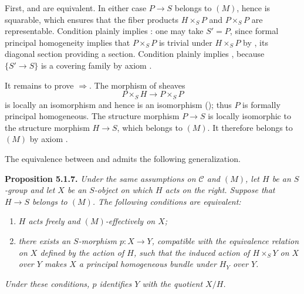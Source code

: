 First,  and  are equivalent. In either case \(P\to S\) belongs to
\((M)\), hence is squarable, which ensures that the fiber products
\(H\times_SP\) and \(P\times_SP\) are representable. Condition  plainly
implies : one may take \(S'=P\), since formal principal homogeneity
implies that \(P\times_SP\) is trivial under \(H\times_SP\) by , its
diagonal section providing a section. Condition  plainly implies ,
because \(\{S'\to S\}\) is a covering family by axiom
.

It remains to prove \(\Rightarrow\). The morphism of sheaves
\[
  P\times_SH\longrightarrow P\times_SP
\]
is locally an isomorphism and hence is an isomorphism (); thus \(P\) is
formally principal homogeneous. The structure morphism \(P\to S\) is
locally isomorphic to the structure morphism \(H\to S\), which belongs to
\((M)\). It therefore belongs to \((M)\) by axiom
.

The equivalence between  and  admits the following generalization.

\medskip
\noindent{}\textbf{Proposition 5.1.7.}
\textit{Under the same assumptions on \(\mathscr C\) and \((M)\), let
\(H\) be an \(S\)-group and let \(X\) be an \(S\)-object on which \(H\)
acts on the right. Suppose that \(H\to S\) belongs to \((M)\). The following
conditions are equivalent:}
\begin{enumerate}
  \item[(i)] \textit{\(H\) acts freely and \((M)\)-effectively on \(X\);}
  \item[(ii)] \textit{there exists an \(S\)-morphism \(p:X\to Y\),
  compatible with the equivalence relation on \(X\) defined by the action
  of \(H\), such that the induced action of \(H\times_SY\) on \(X\) over
  \(Y\) makes \(X\) a principal homogeneous bundle under \(H_Y\) over
  \(Y\).}
\end{enumerate}
\textit{Under these conditions, \(p\) identifies \(Y\) with the quotient
\(X/H\).}

